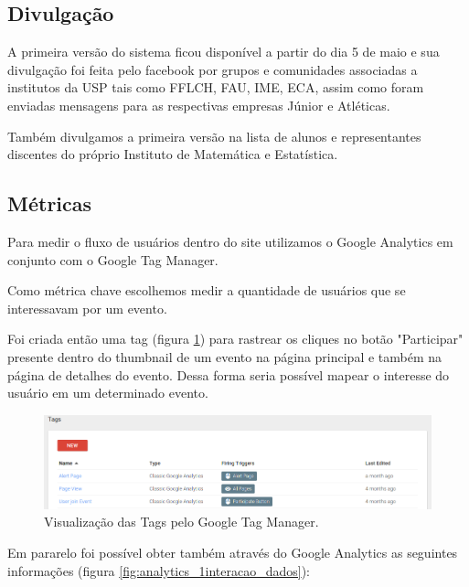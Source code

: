 \subsection{Divulgação}
\par A primeira versão do sistema ficou disponível a partir do dia 5 de maio e sua divulgação foi feita pelo facebook por grupos e comunidades associadas a institutos da USP tais como FFLCH, FAU, IME, ECA, assim como foram enviadas mensagens para as respectivas empresas Júnior e Atléticas.
\par Também divulgamos a primeira versão na lista de alunos e representantes discentes do próprio Instituto de Matemática e Estatística.
\subsection{Métricas}
\par Para medir o fluxo de usuários dentro do site utilizamos o Google Analytics em conjunto com o Google Tag Manager.
\par Como métrica chave escolhemos medir a quantidade de usuários que se interessavam por um evento.
\par Foi criada então uma tag (figura \ref{fig:tags}) para rastrear os cliques no botão "Participar" presente dentro do thumbnail de um evento na página principal e também na página de detalhes do evento. Dessa forma seria possível mapear o interesse do usuário em um determinado evento.
\begin{figure}[htb]
\includegraphics[width=15cm]{figuras/tags}
\caption{\label{fig:tags} Visualização das Tags pelo Google Tag Manager.}
\end{figure}
\par Em pararelo foi possível obter também através do Google Analytics as seguintes informações (figura \ref{fig:analytics_1interacao_dados}):

